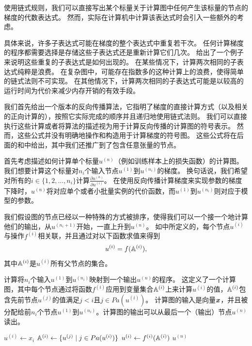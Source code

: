 使用链式规则，我们可以直接写出某个标量关于计算图中任何产生该标量的节点的梯度的代数表达式。
然而，实际在计算机中计算该表达式时会引入一些额外的考虑。

具体来说，许多子表达式可能在梯度的整个表达式中重复若干次。
任何计算梯度的程序都需要选择是存储这些子表达式还是重新计算它们几次。
给出了一个例子来说明这些重复的子表达式是如何出现的。
在某些情况下，计算两次相同的子表达式纯粹是浪费。
在复杂图中，可能存在指数多的这种计算上的浪费，使得简单的链式法则不可实现。
在其他情况下，计算两次相同的子表达式可能是以较高的运行时间为代价来减少内存开销的有效手段。

我们首先给出一个版本的反向传播算法，它指明了梯度的直接计算方式（以及相关的正向计算的），按照它实际完成的顺序并且递归地使用链式法则。
我们可以直接执行这些计算或者将算法的描述视为用于计算反向传播的计算图的符号表示。
然而，这些公式并没有明确地操作和构造用于计算梯度的符号图。
这些公式将在后面的和中给出，其中我们还推广到了包含任意张量的节点。

首先考虑描述如何计算单个标量$u^{(n)}$（例如训练样本上的损失函数）的计算图。
我们想要计算这个标量对$n_i$个输入节点$u^{(1)}$到$u^{(n_i)}$的梯度。
换句话说，我们希望对所有的$i\in\{1,2,\ldots,n_i\}$计算$\frac{\partial u^{(n)}}{\partial u^{(i)}}$。
在使用反向传播计算梯度来实现参数的梯度下降时，$u^{(n)}$将对应单个或者小批量实例的代价函数，而$u^{(1)}$到$u^{(n_i)}$则对应于模型的参数。


我们假设图的节点已经以一种特殊的方式被排序，使得我们可以一个接一个地计算他们的输出，从$u^{(n_i+1)}$开始，一直上升到$u^{(n)}$。
如中所定义的，每个节点$u^{(i)}$与操作$f^{(i)}$相关联，并且通过对以下函数求值来得到
\begin{equation}
  u^{(i)} = f(\mathbb{A}^{(i)}),
\end{equation}
其中$\mathbb{A}^{(i)}$是$u^{(i)}$所有父节点的集合。
\begin{algorithm}[htbp]
\caption{计算将$n_i$个输入$u^{(1)}$到$u^{(n_i)}$映射到一个输出$u^{(n)}$的程序。
这定义了一个计算图，其中每个节点通过将函数$f^{(i)}$应用到变量集合$\mathbb{A}^{(i)}$上来计算$u^{(i)}$的值，$\mathbb{A}^{(i)}$包含先前节点$u^{(j)}$的值满足$j<i$且$j \in Pa(u^{(i)})$。
计算图的输入是向量$\boldsymbol{\mathit{x}}$，并且被分配给前$n_i$个节点$u^{(1)}$到$u^{(n_i)}$。计算图的输出可以从最后一个（输出）节点$u^{(n)}$读出。}
\label{alg:fprop}
\begin{algorithmic}
 \STATE $u^{(i)} \leftarrow x_i$
\ENDFOR
{}
 \STATE $\mathbb{A}^{(i)} \leftarrow \{ u^{(j)} \mid j \in Pa(u^{(i)}) \}$
 \STATE $u^{(i)} \leftarrow f^{(i)}(\mathbb{A}^{(i)})$
\ENDFOR
{} $u^{(n)}$
\end{algorithmic}
\end{algorithm}

